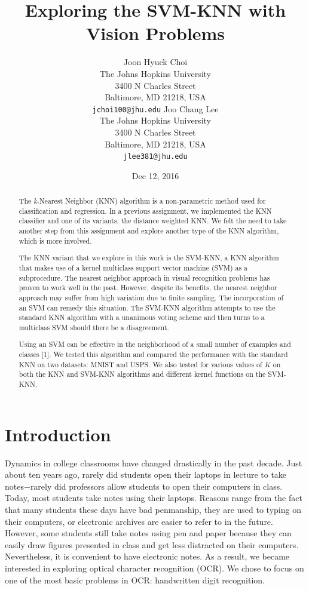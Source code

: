\documentclass[11pt,letterpaper]{article}
\title{Exploring the SVM-KNN with Vision Problems}
\author{Joon Hyuck Choi\\
  The Johns Hopkins University\\
  3400 N Charles Street\\
  Baltimore, MD 21218, USA\\
  {\tt jchoi100@jhu.edu}
  \And
  Joo Chang Lee \\
  The Johns Hopkins University \\
  3400 N Charles Street\\
  Baltimore, MD 21218, USA\\
  {\tt jlee381@jhu.edu}}
\date{Dec 12, 2016}
\begin{document}
\maketitle
\begin{abstract}
The \textit{k}-Nearest Neighbor (KNN) algorithm is a non-parametric method used for classification and regression. In a previous assignment, we implemented the KNN classifier and one of its variants, the distance weighted KNN. We felt the need to take another step from this assignment and explore another type of the KNN algorithm, which is more involved.

The KNN variant that we explore in this work is the SVM-KNN, a KNN algorithm that makes use of a kernel multiclass support vector machine (SVM) as a subprocedure. The nearest neighbor approach in visual recognition problems has proven to work well in the past. However, despite its benefits, the nearest neighbor approach may suffer from high variation due to finite sampling. The incorporation of an SVM can remedy this situation. The SVM-KNN algorithm attempts to use the standard KNN algorithm with a unanimous voting scheme and then turns to a multiclass SVM should there be a disagreement.

Using an SVM can be effective in the neighborhood of a small number of examples and classes [1]. We tested this algorithm and compared the performance with the standard KNN on two datasets: MNIST and USPS. We also tested for various values of $K$ on both the KNN and SVM-KNN algorithms and different kernel functions on the SVM-KNN.

\end{abstract}

\section{Introduction}

Dynamics in college classrooms have changed drastically in the past decade. Just about ten years ago, rarely did students open their laptops in lecture to take notes$-$rarely did professors allow students to open their computers in class. Today, most students take notes using their laptops. Reasons range from the fact that many students these days have bad penmanship, they are used to typing on their computers, or electronic archives are easier to refer to in the future. However, some students still take notes using pen and paper because they can easily draw figures presented in class and get less distracted on their computers. Nevertheless, it is convenient to have electronic notes. As a result, we became interested in exploring optical character recognition (OCR). We chose to focus on one of the most basic problems in OCR: handwritten digit recognition.
\end{document}
